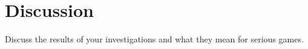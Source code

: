 \section{Discussion}
Discuss the results of your investigations and what they mean for serious games.